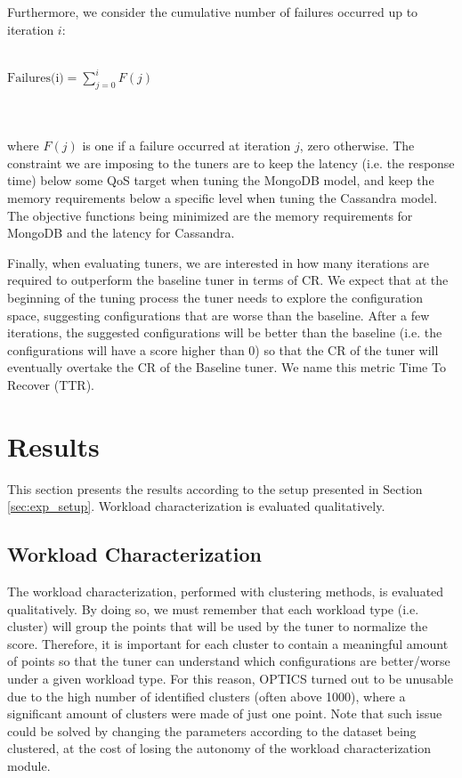 \documentclass[a4paper, 12pt]{article} %
\begin{document}
	Furthermore, we consider the cumulative number of failures occurred up to iteration $i$:\\\\
	\centerline{
		$
		\text{Failures(i)} = \sum_{j=0}^{i} F(j)
		$
	}\\\\
	where $F(j)$ is one if a failure occurred at iteration $j$, zero otherwise. The constraint we are imposing to the tuners are to keep the latency (i.e. the response time) below some QoS target when tuning the MongoDB model, and keep the memory requirements below a specific level when tuning the Cassandra model.\\
	The objective functions being minimized are the memory requirements for MongoDB and the latency for Cassandra.
	
	Finally, when evaluating tuners, we are interested in how many iterations are required to outperform the baseline tuner in terms of CR. We expect that at the beginning of the tuning process the tuner needs to explore the configuration space, suggesting configurations that are worse than the baseline. After a few iterations, the suggested configurations will be better than the baseline (i.e. the configurations will have a score higher than 0) so that the CR of the tuner will eventually overtake the CR of the Baseline tuner. We name this metric Time To Recover (TTR).
	
	\section{Results } \label{sec:results}
	This section presents the results according to the setup presented in Section \ref{sec:exp_setup}. Workload characterization is evaluated qualitatively. 
	
	\subsection{Workload Characterization } \label{ssec:results_wkld_characterization}
	The workload characterization, performed with clustering methods, is evaluated qualitatively.
	By doing so, we must remember that each workload type (i.e. cluster) will group the points that will be used by the tuner to normalize the score. Therefore, it is important for each cluster to contain a meaningful amount of points so that the tuner can understand which configurations are better/worse under a given workload type. For this reason, OPTICS turned out to be unusable due to the high number of identified clusters (often above 1000), where a significant amount of clusters were made of just one point. Note that such issue could be solved by changing the parameters according to the dataset being clustered, at the cost of losing the autonomy of the workload characterization module.  
	
\end{document}
